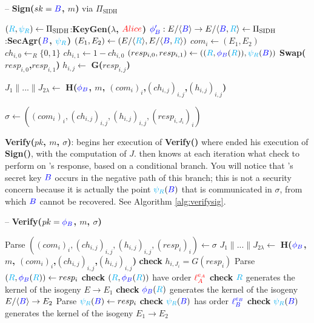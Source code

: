 \begin{algorithm}
\caption{-- \textbf{Sign($sk = \textcolor{blue}{B}$, $m$)} via $\Pi_{\text{SIDH}}$}
\label{alg:signviasidh}
\begin{algorithmic}[1]
	\State $(\textcolor{cyan}{R},\textcolor{cyan}{\psi_R}) \gets \Pi_{\text{SIDH}}$:\textbf{KeyGen($\lambda$, $\textcolor{red}{Alice}$)}
	\State $\textcolor{blue}{\phi'_B}: E/\langle \textcolor{blue}{B} \rangle \rightarrow E/\langle \textcolor{blue}{B},\textcolor{cyan}{R} \rangle \gets \Pi_{\text{SIDH}}$:\textbf{SecAgr($\textcolor{blue}{B}$, $\textcolor{cyan}{\psi_R}$)}
	\State $(E_{1},E_{2}) \gets (E/\langle \textcolor{cyan}{R} \rangle, E/\langle \textcolor{blue}{B},\textcolor{cyan}{R} \rangle)$
	\State $com_{i} \gets (E_{1}, E_{2})$
	\State $ch_{i,0} \gets_{R} \{0,1\}$
	\State $ch_{i,1} \gets 1 - ch_{i,0}$
	\State $(resp_{i,0}, resp_{i,1}) \gets ((\textcolor{cyan}{R},\textcolor{blue}{\phi_B}(\textcolor{cyan}{R})), \textcolor{cyan}{\psi_R}(\textcolor{blue}{B}))$
		\State \textbf{Swap($resp_{i,0}$,$resp_{i,1}$)}
	\EndIf
	\State $h_{i,j} \gets$ \textbf{G($resp_{i,j}$)}
\EndFor

\State $J_{1} \parallel ... \parallel J_{2\lambda} \gets$ \textbf{H($\textcolor{blue}{\phi_B}$, $m$, $(com_{i})_{i}$,$(ch_{i,j})_{i,j}$,$(h_{i,j})_{i,j}$)}

\State \Return $\sigma \gets ((com_{i})_{i}, (ch_{i,j})_{i,j}, (h_{i,j})_{i,j}, (resp_{i,J_{i}})_{i})$
\end{algorithmic}
\end{algorithm}


\noindent
\textbf{Verify($pk$, $m$, $\sigma$)}: \alice begins her execution of \textbf{Verify()} where \bob ended his execution of \textbf{Sign()}, with the computation of $J$. \alice then knows at each iteration what check to perform on \bob's response, based on a conditional branch. You will notice that \bob's secret key $\textcolor{blue}{B}$ occurs in the negative path of this branch; this is not a security concern because it is actually the point $\textcolor{cyan}{\psi_R}(\textcolor{blue}{B})$ that is communicated in $\sigma$, from which $\textcolor{blue}{B}$ cannot be recovered. See Algorithm \ref{alg:verifysig}.\\

\begin{algorithm}[H]
\caption{-- \textbf{Verify($pk = \textcolor{blue}{\phi_B}$, $m$, $\sigma$)}}
\label{alg:verifysig}
\begin{algorithmic}[1]
\State Parse $((com_i)_i, (ch_{i,j})_{i,j}, (h_{i,j})_{i,j}, (resp_{i})_{i}) \gets \sigma$
\State $J_{1} \parallel ... \parallel J_{2\lambda} \gets$ \textbf{H($\textcolor{blue}{\phi_B}$, $m$, $(com_{i})_{i}$,$(ch_{i,j})_{i,j}$,$(h_{i,j})_{i,j}$)}
	\State \textbf{check} $h_{i,J_{i}} = G(resp_{i})$
		\State Parse $(\textcolor{cyan}{R},\textcolor{blue}{\phi_B}(\textcolor{cyan}{R})) \gets resp_{i}$
		\State \textbf{check} $(\textcolor{cyan}{R}, \textcolor{blue}{\phi_B}(\textcolor{cyan}{R}))$ have order $\textcolor{red}{\ell_{A}^{e_A}}$
		\State \textbf{check} $\textcolor{cyan}{R}$ generates the kernel of the isogeny $E \rightarrow E_{1}$
		\State \textbf{check} $\textcolor{blue}{\phi_B}(\textcolor{cyan}{R})$ generates the kernel of the isogeny $E/\langle \textcolor{blue}{B} \rangle \rightarrow E_{2}$
	\Else
		\State Parse $\textcolor{cyan}{\psi_R}(\textcolor{blue}{B}) \gets resp_{i}$
		\State \textbf{check} $\textcolor{cyan}{\psi_R}(\textcolor{blue}{B})$ has order $\textcolor{blue}{\ell_{B}^{e_B}}$
		\State \textbf{check} $\textcolor{cyan}{\psi_R}(\textcolor{blue}{B})$ generates the kernel of the isogeny $E_{1} \rightarrow E_{2}$
	\EndIf
\EndFor

	\State {}
\Else
	\State {}
\EndIf
\end{algorithmic}
\end{algorithm}

